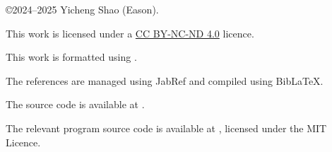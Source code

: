 \noindent \copyright 2024--2025 Yicheng Shao (Eason).\nocite{*}

\noindent This work is licensed under a \href{https://creativecommons.org/licenses/by-nc-nd/4.0/}{CC BY-NC-ND 4.0} licence.

\noindent This work is formatted using \XeLaTeX.

\noindent The references are managed using JabRef \autocite{soft-jabref} and compiled using Bib\LaTeX.

\noindent The source code is available at .

\noindent The relevant program source code is available at , licensed under the MIT Licence.
